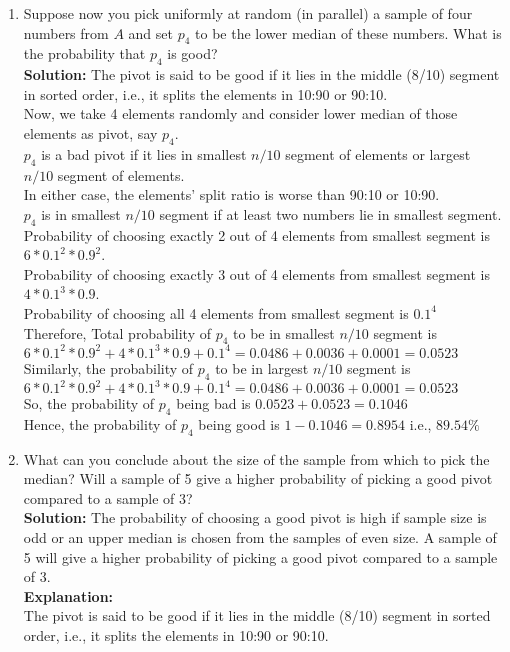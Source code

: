 \documentclass[12pt]{article}
\begin{document}
\begin{enumerate}
\begin{enumerate}
\item Suppose now you pick uniformly at random (in parallel) a sample of four numbers from $A$ and set $p_4$ to be the lower median of these numbers. What is the probability that $p_4$ is good?\\
\textbf{Solution:} The pivot is said to be good if it lies in the middle (8/10) segment in sorted order, i.e., it splits the elements in 10:90 or 90:10.\\
Now, we take 4 elements randomly and consider lower median of those elements as pivot, say $p_4$.\\
$p_4$ is a bad pivot if it lies in smallest $n/10$ segment of elements or largest $n/10$ segment of elements.\\
In either case, the elements' split ratio is worse than 90:10 or 10:90.\\
$p_4$ is in smallest $n/10$ segment if at least two numbers lie in smallest segment.\\
Probability of choosing exactly 2 out of 4 elements from smallest segment is $6*0.1^2*0.9^2$.\\
Probability of choosing exactly 3 out of 4 elements from smallest segment is $4*0.1^3*0.9$.\\
Probability of choosing all 4 elements from smallest segment is $0.1^4$\\
Therefore, Total probability of $p_4$ to be in smallest $n/10$ segment is $6*0.1^2*0.9^2 + 4*0.1^3*0.9 + 0.1^4 = 0.0486 +  0.0036 + 0.0001 = 0.0523$\\
Similarly, the probability of $p_4$ to be in largest $n/10$ segment is $6*0.1^2*0.9^2 + 4*0.1^3*0.9 + 0.1^4 = 0.0486 +  0.0036 + 0.0001 = 0.0523$\\
So, the probability of $p_4$ being bad is $0.0523 + 0.0523 = 0.1046$\\
Hence, the probability of $p_4$ being good is $1- 0.1046 = 0.8954$ i.e., $89.54\%$
\item What can you conclude about the size of the sample from which to pick the median? Will a sample of 5 give a higher probability of picking a good pivot compared to a sample of 3?\\
\textbf{Solution:} The probability of choosing a good pivot is high if sample size is odd or an upper median is chosen from the samples of even size.
A sample of 5 will give a higher probability of picking a good pivot compared to a sample of 3.\\
\textbf{Explanation:}\\
The pivot is said to be good if it lies in the middle (8/10) segment in sorted order, i.e., it splits the elements in 10:90 or 90:10.\\

\end{enumerate}
\end{enumerate}
\end{document}
